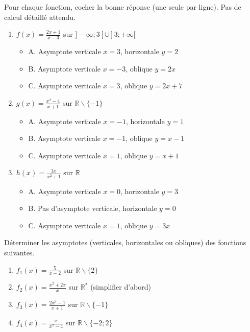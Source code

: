 \documentclass[11pt]{article}
\def\setminus{\mathbin{\backslash}}\let\smallsetminus\setminus
\begin{document}
\begin{exercice}
Pour chaque fonction, cocher la bonne réponse (une seule par ligne). Pas de calcul détaillé attendu.
\begin{enumerate}
    \item $f(x) = \frac{2x+1}{x-3}$ sur $]-\infty;3[ \cup ]3;+\infty[$
    \begin{itemize}
        \item A. Asymptote verticale $x=3$, horizontale $y=2$
        \item B. Asymptote verticale $x=-3$, oblique $y=2x$
        \item C. Asymptote verticale $x=3$, oblique $y=2x+7$
    \end{itemize}
    \item $g(x) = \frac{x^2-4}{x+1}$ sur $\mathbb{R}\setminus\{-1\}$
    \begin{itemize}
        \item A. Asymptote verticale $x=-1$, horizontale $y=1$
        \item B. Asymptote verticale $x=-1$, oblique $y=x-1$
        \item C. Asymptote verticale $x=1$, oblique $y=x+1$
    \end{itemize}
    \item $h(x) = \frac{3x}{x^2+1}$ sur $\mathbb{R}$
    \begin{itemize}
        \item A. Asymptote verticale $x=0$, horizontale $y=3$
        \item B. Pas d'asymptote verticale, horizontale $y=0$
        \item C. Asymptote verticale $x=1$, oblique $y=3x$
    \end{itemize}
\end{enumerate}
\end{exercice}

\begin{exercice}
Déterminer les asymptotes (verticales, horizontales ou obliques) des fonctions suivantes.
\begin{enumerate}
    \item $f_1(x) = \frac{5}{x-2}$ sur $\mathbb{R}\setminus\{2\}$
    \item $f_2(x) = \frac{x^2+2x}{x}$ sur $\mathbb{R}^*$ (simplifier d'abord)
    \item $f_3(x) = \frac{2x^2-1}{x+1}$ sur $\mathbb{R}\setminus\{-1\}$
    \item $f_4(x) = \frac{x}{x^2-4}$ sur $\mathbb{R}\setminus\{-2;2\}$
\end{enumerate}
\end{exercice}
\end{document}
